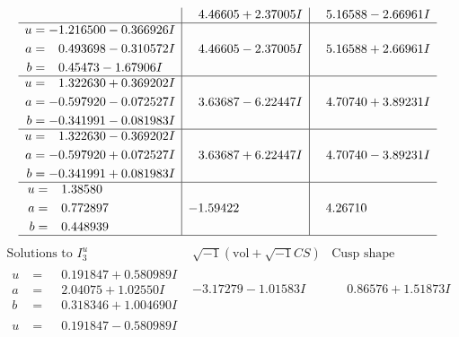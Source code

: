 \documentclass[1p]{elsarticle_modified}
\theoremstyle{definition}
\newcommand{\I}{\sqrt{-1}}
\begin{document}
$$\begin{array}{c|c|c}
 & \phantom{-}4.46605 + 2.37005 I & \phantom{-}5.16588 - 2.66961 I \\ \hline\begin{aligned}
u &= -1.216500 - 0.366926 I \\
a &= \phantom{-}0.493698 - 0.310572 I \\
b &= \phantom{-}0.45473 - 1.67906 I\end{aligned}
 & \phantom{-}4.46605 - 2.37005 I & \phantom{-}5.16588 + 2.66961 I \\ \hline\begin{aligned}
u &= \phantom{-}1.322630 + 0.369202 I \\
a &= -0.597920 - 0.072527 I \\
b &= -0.341991 - 0.081983 I\end{aligned}
 & \phantom{-}3.63687 - 6.22447 I & \phantom{-}4.70740 + 3.89231 I \\ \hline\begin{aligned}
u &= \phantom{-}1.322630 - 0.369202 I \\
a &= -0.597920 + 0.072527 I \\
b &= -0.341991 + 0.081983 I\end{aligned}
 & \phantom{-}3.63687 + 6.22447 I & \phantom{-}4.70740 - 3.89231 I \\ \hline\begin{aligned}
u &= \phantom{-}1.38580\phantom{ +0.000000I} \\
a &= \phantom{-}0.772897\phantom{ +0.000000I} \\
b &= \phantom{-}0.448939\phantom{ +0.000000I}\end{aligned}
 & -1.59422\phantom{ +0.000000I} & \phantom{-}4.26710\phantom{ +0.000000I}\\
 \hline 
 \end{array}$$\newpage$$\begin{array}{c|c|c}  
\text{Solutions to }I^u_{3}& \I (\text{vol} + \sqrt{-1}CS) & \text{Cusp shape}\\
 \hline 
\begin{aligned}
u &= \phantom{-}0.191847 + 0.580989 I \\
a &= \phantom{-}2.04075 + 1.02550 I \\
b &= \phantom{-}0.318346 + 1.004690 I\end{aligned}
 & -3.17279 - 1.01583 I & \phantom{-}0.86576 + 1.51873 I \\ \hline\begin{aligned}
u &= \phantom{-}0.191847 - 0.580989 I \\

\end{aligned}
\end{array}$$
\end{document}
